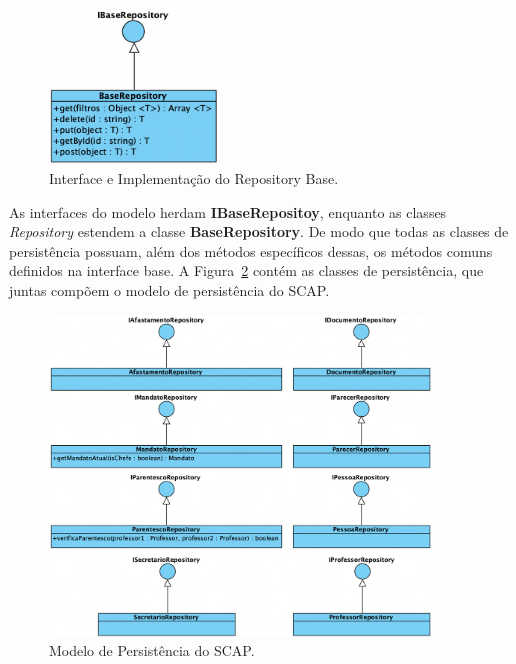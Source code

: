 \begin{figure}[h!]
    \centering
    \includegraphics[width=0.4\textwidth]{figuras/fig-modelo-persist-base.png}
    \caption{Interface e Implementação do Repository Base.}
    \label{fig-modelo-persist-base}
\end{figure}


As interfaces do modelo herdam \textbf{IBaseRepositoy}, enquanto as classes \textit{Repository} estendem a
classe \textbf{BaseRepository}. De modo que todas as classes de persistência possuam, além dos métodos
específicos dessas, os métodos comuns definidos na interface base. A Figura~\ref{fig-modelo-persist}
contém as classes de persistência, que juntas compõem o modelo de persistência do SCAP.

\begin{figure}[h!]
    \centering
    \includegraphics[width=0.9\textwidth]{figuras/fig-modelo-persist.png}
    \caption{Modelo de Persistência do SCAP.}
    \label{fig-modelo-persist}
\end{figure}

\FloatBarrier



